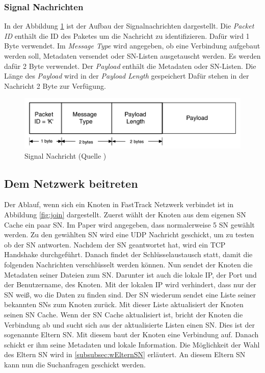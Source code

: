 \subsubsection{Signal Nachrichten}
\label{subsubsec:sigN}

In der Abbildung \ref{fig:sigN} ist der Aufbau der Signalnachrichten dargestellt.
Die \textit{Packet ID} enthält die ID des Paketes um die Nachricht zu identifizieren.
Dafür wird 1 Byte verwendet.
Im \textit{Message Type} wird angegeben, ob eine Verbindung aufgebaut werden soll, Metadaten versendet oder SN-Listen ausgetauscht werden.
Es werden dafür 2 Byte verwendet.
Der \textit{Payload} enthält die Metadaten oder SN-Listen.
Die Länge des \textit{Payload} wird in der \textit{Payload Length} gespeichert
Dafür stehen in der Nachricht 2 Byte zur Verfügung.

\begin{figure}
\includegraphics[scale=0.25]{gfx/signal_message}
\caption{Signal Nachricht (Quelle \cite{liang2006fasttrack})}
\label{fig:sigN}
\end{figure}

\subsection{Dem Netzwerk beitreten}
\label{subsec:join}

Der Ablauf, wenn sich ein Knoten in FastTrack Netzwerk verbindet ist in Abbildung \ref{fig:join} dargestellt.
Zuerst wählt der Knoten aus dem eigenen SN Cache ein paar SN.
Im Paper \cite{liang2006fasttrack} wird angegeben, dass normalerweise 5 SN gewählt werden.
Zu den gewählten SN wird eine UDP Nachricht geschickt, um zu testen ob der SN antworten.
Nachdem der SN geantwortet hat, wird ein TCP Handshake durchgeführt. 
Danach findet der Schlüsselaustausch statt, damit die folgenden Nachrichten verschlüsselt werden können.
Nun sendet der Knoten die Metadaten seiner Dateien zum SN.
Darunter ist auch die lokale IP, der Port und der Benutzername, des Knoten.
Mit der lokalen IP wird verhindert, dass nur der SN weiß, wo die Daten zu finden sind.
Der SN wiederum sendet eine Liste seiner bekannten SNs zum Knoten zurück.
Mit dieser Liste aktualisiert der Knoten seinen SN Cache.
Wenn der SN Cache aktualisiert ist, bricht der Knoten die Verbindung ab und sucht sich aus der aktualisierte Listen einen SN.
Dies ist der sogenannte Eltern SN. 
Mit diesem baut der Knoten eine Verbindung auf.
Danach schickt er ihm seine Metadaten und lokale Information.
Die Möglichkeit der Wahl des Eltern SN wird in \ref{subsubsec:wElternSN} erläutert.
An diesem Eltern SN kann nun die Suchanfragen geschickt werden.

